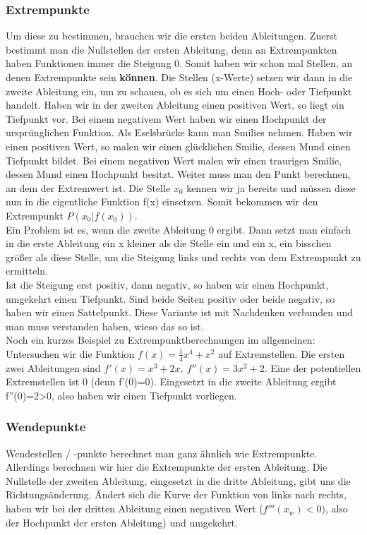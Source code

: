 	\subsubsection{Extrempunkte}
		Um diese zu bestimmen,  brauchen wir die ersten beiden Ableitungen. Zuerst
		bestimmt man die Nullstellen der ersten Ableitung, denn an Extrempunkten haben
		Funktionen immer die Steigung 0. Somit haben wir schon mal Stellen, an denen
		Extrempunkte sein \textbf{können}. Die Stellen (x-Werte) setzen wir dann in
		die zweite Ableitung ein, um zu schauen, ob es sich um einen Hoch- oder
		Tiefpunkt handelt. Haben wir in der zweiten Ableitung einen positiven Wert, so
		liegt ein Tiefpunkt vor. Bei einem negativem Wert haben wir einen Hochpunkt
		der ursprünglichen Funktion. Als Eselsbrücke kann man Smilies nehmen. Haben
		wir einen positiven Wert, so malen wir einen glücklichen Smilie, dessen Mund
		einen Tiefpunkt bildet. Bei einem negativen Wert malen wir einen traurigen
		Smilie, dessen Mund einen Hochpunkt besitzt. Weiter muss man den Punkt
		berechnen, an dem der Extremwert ist. Die Stelle \(x_0\) kennen wir ja bereits
		und müssen diese nun in die eigentliche Funktion f(x) einsetzen. Somit
		bekommen wir den Extrempunkt \(P(x_0|f(x_0))\).\\
		Ein Problem ist es, wenn die zweite Ableitung 0 ergibt. Dann setzt man einfach
		in die erste Ableitung ein x kleiner als die Stelle ein und ein x, ein
		bisschen größer als diese Stelle, um die Steigung links und rechts von dem
		Extrempunkt zu ermitteln. \\
		Ist die Steigung erst positiv, dann negativ, so haben wir einen Hochpunkt,
		umgekehrt einen Tiefpunkt. Sind beide Seiten positiv oder beide negativ, so
		haben wir einen Sattelpunkt. Diese Variante ist mit Nachdenken verbunden und
		man muss verstanden haben, wieso das so ist.\\
		Noch ein kurzes Beispiel zu Extrempunktberechnungen im allgemeinen:
		Untersuchen wir die Funktion \(f(x)=\frac{1}{4}x^4+x^2\) auf Extremstellen.
		Die ersten zwei Ableitungen sind \(f'(x)=x^3+2x,\ f''(x)=3x^2+2\). Eine der
		potentiellen Extremstellen ist 0 (denn f'(0)=0). Eingesetzt in die zweite
		Ableitung ergibt f''(0)=2>0, also haben wir einen Tiefpunkt vorliegen.

	\subsubsection{Wendepunkte}
		Wendestellen / -punkte berechnet man ganz ähnlich wie Extrempunkte. Allerdings
		berechnen wir hier die Extrempunkte der ersten Ableitung. Die Nullstelle der
		zweiten Ableitung, eingesetzt in die dritte Ableitung, gibt uns die
		Richtungsänderung. Ändert sich die Kurve der Funktion von links nach rechts,
		haben wir bei der dritten Ableitung einen negativen Wert (\(f'''(x_w)<0)\),
		also der Hochpunkt der ersten Ableitung) und umgekehrt.
	
